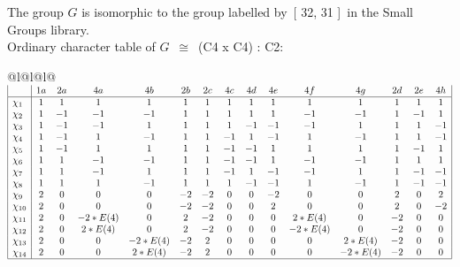 \documentclass[varwidth=\maxdimen,border=10]{standalone}
\begin{document}
The group $G$ is isomorphic to the group labelled by\ [ 32, 31 ]\ in the Small Groups library.\\
Ordinary character table of $G$\ $\cong$\ (C4 x C4) : C2:\\
\begin{center}
\begin{tabular}{@{}l@{}l@{}l@{}}
\hline
\(\begin{array}{|l|cccccccccccccc|}
  & 1a & 2a & 4a & 4b & 2b & 2c & 4c & 4d & 4e & 4f & 4g & 2d & 2e & 4h\\ \hline
\chi_{1} & 1 & 1 & 1 & 1 & 1 & 1 & 1 & 1 & 1 & 1 & 1 & 1 & 1 & 1\\
\chi_{2} & 1 & -1 & -1 & -1 & 1 & 1 & 1 & 1 & 1 & -1 & -1 & 1 & -1 & 1\\
\chi_{3} & 1 & -1 & -1 & 1 & 1 & 1 & 1 & -1 & -1 & -1 & 1 & 1 & 1 & -1\\
\chi_{4} & 1 & -1 & 1 & -1 & 1 & 1 & -1 & 1 & -1 & 1 & -1 & 1 & 1 & -1\\
\chi_{5} & 1 & -1 & 1 & 1 & 1 & 1 & -1 & -1 & 1 & 1 & 1 & 1 & -1 & 1\\
\chi_{6} & 1 & 1 & -1 & -1 & 1 & 1 & -1 & -1 & 1 & -1 & -1 & 1 & 1 & 1\\
\chi_{7} & 1 & 1 & -1 & 1 & 1 & 1 & -1 & 1 & -1 & -1 & 1 & 1 & -1 & -1\\
\chi_{8} & 1 & 1 & 1 & -1 & 1 & 1 & 1 & -1 & -1 & 1 & -1 & 1 & -1 & -1\\
\chi_{9} & 2 & 0 & 0 & 0 & -2 & -2 & 0 & 0 & -2 & 0 & 0 & 2 & 0 & 2\\
\chi_{10} & 2 & 0 & 0 & 0 & -2 & -2 & 0 & 0 & 2 & 0 & 0 & 2 & 0 & -2\\
\chi_{11} & 2 & 0 & -2*E(4) & 0 & 2 & -2 & 0 & 0 & 0 & 2*E(4) & 0 & -2 & 0 & 0\\
\chi_{12} & 2 & 0 & 2*E(4) & 0 & 2 & -2 & 0 & 0 & 0 & -2*E(4) & 0 & -2 & 0 & 0\\
\chi_{13} & 2 & 0 & 0 & -2*E(4) & -2 & 2 & 0 & 0 & 0 & 0 & 2*E(4) & -2 & 0 & 0\\
\chi_{14} & 2 & 0 & 0 & 2*E(4) & -2 & 2 & 0 & 0 & 0 & 0 & -2*E(4) & -2 & 0 & 0\\
\hline
\end{array}\)\\
\end{tabular}
\end{center}
\end{document}
